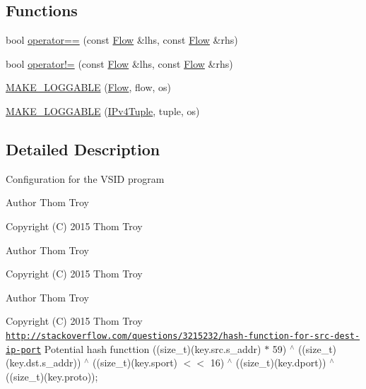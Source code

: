 \subsection*{Functions}
\begin{DoxyCompactItemize}
\item 
bool \hyperlink{namespace_vsid_common_a96f8765b6113d5628331fd3f6c1ead2d}{operator==} (const \hyperlink{class_vsid_common_1_1_flow}{Flow} \&lhs, const \hyperlink{class_vsid_common_1_1_flow}{Flow} \&rhs)
\item 
bool \hyperlink{namespace_vsid_common_ab26dd6287c1246530fee0857f724f081}{operator!=} (const \hyperlink{class_vsid_common_1_1_flow}{Flow} \&lhs, const \hyperlink{class_vsid_common_1_1_flow}{Flow} \&rhs)
\item 
\hyperlink{namespace_vsid_common_a83fc47c790d5ec8e57c0c8dc4499d166}{M\-A\-K\-E\-\_\-\-L\-O\-G\-G\-A\-B\-L\-E} (\hyperlink{class_vsid_common_1_1_flow}{Flow}, flow, os)
\item 
\hyperlink{namespace_vsid_common_acf7e5686da4da777600212ca4250235c}{M\-A\-K\-E\-\_\-\-L\-O\-G\-G\-A\-B\-L\-E} (\hyperlink{class_vsid_common_1_1_i_pv4_tuple}{I\-Pv4\-Tuple}, tuple, os)
\end{DoxyCompactItemize}


\subsection{Detailed Description}
Configuration for the V\-S\-I\-D program

\begin{DoxyAuthor}{Author}
Thom Troy
\end{DoxyAuthor}
Copyright (C) 2015 Thom Troy

\begin{DoxyAuthor}{Author}
Thom Troy
\end{DoxyAuthor}
Copyright (C) 2015 Thom Troy

\begin{DoxyAuthor}{Author}
Thom Troy
\end{DoxyAuthor}
Copyright (C) 2015 Thom Troy \href{http://stackoverflow.com/questions/3215232/hash-function-for-src-dest-ip-port}{\tt http\-://stackoverflow.\-com/questions/3215232/hash-\/function-\/for-\/src-\/dest-\/ip-\/port} Potential hash functtion ((size\-\_\-t)(key.\-src.\-s\-\_\-addr) $\ast$ 59) $^\wedge$ ((size\-\_\-t)(key.\-dst.\-s\-\_\-addr)) $^\wedge$ ((size\-\_\-t)(key.\-sport) $<$$<$ 16) $^\wedge$ ((size\-\_\-t)(key.\-dport)) $^\wedge$ ((size\-\_\-t)(key.\-proto));

